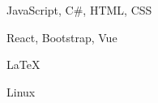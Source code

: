 \documentclass[11pt]{spidercv}
\begin{document}
    \begin{SideBar}{\ColorBackground}{\ColorTextSide}
        
        
        
        \vspace*{1cm}

        \begin{ItemList}{\ColorHighlight}
            \item [\faCode] JavaScript, C\#, HTML, CSS 
            \item [\faCubes] React, Bootstrap, Vue 
            \item [\faPencilSquareO] {\LaTeX} 
            \item [\faGear] Linux 
        \end{ItemList}

        \vspace*{1cm}


        \begin{SpiderDiagram}{\ColorTextSide}{\ColorHighlight}
        \end{SpiderDiagram}

        \vspace*{1cm}


        \begin{SkillGauges}{\ColorHighlight}
        \end{SkillGauges}
    \end{SideBar}

    

    \DefineProfile{\ColorOther}{\ColorTextSide}{}
\end{document}

